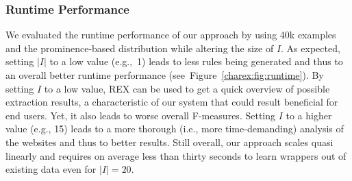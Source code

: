 \subsubsection{Runtime Performance}
We evaluated the runtime performance of our approach by using 40k examples and the prominence-based distribution while altering the size of $I$.
As expected, setting $|I|$ to a low value (e.g.,~1) leads to less rules being generated and thus to an overall better runtime performance (see~Figure~\ref{charex:fig:runtime}).
By setting $I$ to a low value, REX can be used to get a quick overview of possible extraction results, a
characteristic of our system that could result beneficial for end users.
Yet, it also leads to worse overall F-measures.
Setting $I$ to a higher value (e.g., 15) leads to a more thorough (i.e., more time-demanding) analysis of the websites and thus to better results. 
Still overall, our approach scales quasi linearly and requires on average less than thirty seconds to learn wrappers out of existing data even for $|I|=20$.

